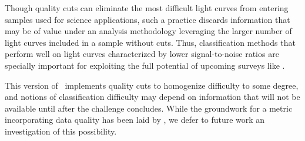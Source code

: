 Though quality cuts can eliminate the most difficult light curves from entering samples used for science applications, such a practice discards information that may be of value under an analysis methodology leveraging the larger number of light curves included in a sample without cuts.
Thus, classification methods that perform well on light curves characterized by lower signal-to-noise ratios are specially important for exploiting the full potential of upcoming surveys like \lsst.

This version of \plasticc\ implements quality cuts to homogenize difficulty to some degree, and notions of classification difficulty may depend on information that will not be available until after the challenge concludes.
While the groundwork for a metric incorporating data quality has been laid by \citet{wu_radio_2018}, we defer to future work an investigation of this possibility.
